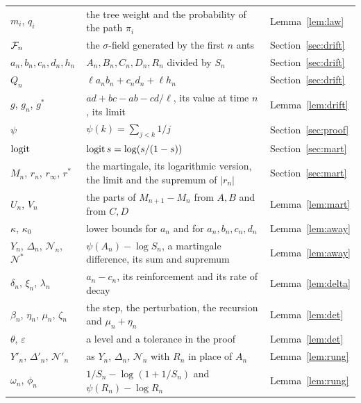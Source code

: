 \begin{center}
\begin{tabular}{@{}lp{}l@{}}
$m_i$, $q_i$ & the tree weight and the probability of the path $\pi_i$ & Lemma~\ref{lem:law}\\
$\mathcal{F}_n$ & the $\sigma$-field generated by the first $n$ ants & Section~\ref{sec:drift}\\
$a_n,b_n,c_n,d_n,h_n$ & $A_n,B_n,C_n,D_n,R_n$ divided by $S_n$ & Section~\ref{sec:drift}\\
$Q_n$ & $\ell a_nb_n+c_nd_n+\ell h_n$ & Section~\ref{sec:drift}\\
$g$, $g_n$, $g^*$ & $ad+bc-ab-cd/\ell$, its value at time $n$, its limit & Lemma~\ref{lem:drift}\\
$\psi$ & $\psi(k)=\sum_{j<k}1/j$ & Section~\ref{sec:proof}\\
$\operatorname{logit}$ & $\operatorname{logit} s=\log(s/(1-s))$ & Section~\ref{sec:mart}\\
$M_n$, $r_n$, $r_\infty$, $r^*$ & the martingale, its logarithmic version, the limit and the supremum of $|r_n|$ & Section~\ref{sec:mart}\\
$U_n$, $V_n$ & the parts of $M_{n+1}-M_n$ from $A,B$ and from $C,D$ & Lemma~\ref{lem:mart}\\
$\kappa$, $\kappa_0$ & lower bounds for $a_n$ and for $a_n,b_n,c_n,d_n$ & Lemma~\ref{lem:away}\\
$Y_n$, $\Delta_n$, $\mathcal N_n$, $\mathcal N^*$ & $\psi(A_n)-\log S_n$, a martingale difference, its sum and supremum & Lemma~\ref{lem:away}\\
$\delta_n$, $\xi_n$, $\lambda_n$ & $a_n-c_n$, its reinforcement and its rate of decay & Lemma~\ref{lem:delta}\\
$\beta_n$, $\eta_n$, $\mu_n$, $\zeta_n$ & the step, the perturbation, the recursion and $\mu_n+\eta_n$ & Lemma~\ref{lem:det}\\
$\theta$, $\varepsilon$ & a level and a tolerance in the proof & Lemma~\ref{lem:det}\\
$Y'_n$, $\Delta'_n$, $\mathcal N'_n$ & as $Y_n$, $\Delta_n$, $\mathcal N_n$ with $R_n$ in place of $A_n$ & Lemma~\ref{lem:rung}\\
$\omega_n$, $\phi_n$ & $1/S_n-\log(1+1/S_n)$ and $\psi(R_n)-\log R_n$ & Lemma~\ref{lem:rung}\\
\bottomrule
\end{tabular}
\end{center}
